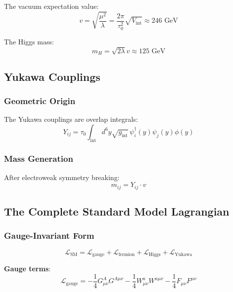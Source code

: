 The vacuum expectation value:
\begin{equation}
    v = \sqrt{\frac{\mu^2}{\lambda}} = \frac{2\pi}{\tau_0^2}\sqrt{V_{\text{int}}} \approx 246 \text{ GeV}
\end{equation}

The Higgs mass:
\begin{equation}
    m_H = \sqrt{2\lambda}v \approx 125 \text{ GeV}
\end{equation}

\subsection{Yukawa Couplings}

\subsubsection{Geometric Origin}

The Yukawa couplings are overlap integrals:
\begin{equation}
    Y_{ij} = \tau_0 \int_{\text{int}} d^6y \sqrt{g_{\text{int}}} \, \psi_i^\dagger(y) \psi_j(y) \phi(y)
\end{equation}

\subsubsection{Mass Generation}

After electroweak symmetry breaking:
\begin{equation}
    m_{ij} = Y_{ij} \cdot v
\end{equation}

\subsection{The Complete Standard Model Lagrangian}

\subsubsection{Gauge-Invariant Form}

\begin{equation}
    \mathcal{L}_{\text{SM}} = \mathcal{L}_{\text{gauge}} + \mathcal{L}_{\text{fermion}} + \mathcal{L}_{\text{Higgs}} + \mathcal{L}_{\text{Yukawa}}
\end{equation}

\textbf{Gauge terms}:
\begin{equation}
    \mathcal{L}_{\text{gauge}} = -\frac{1}{4}G_{\mu\nu}^A G^{A\mu\nu} - \frac{1}{4}W_{\mu\nu}^a W^{a\mu\nu} - \frac{1}{4}F_{\mu\nu}F^{\mu\nu}
\end{equation}

